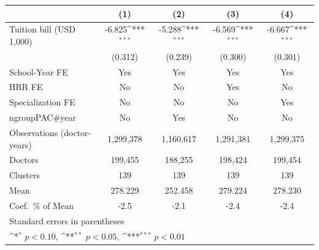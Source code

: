 {
\def\sym#1{\ifmmode^{#1}\else\(^{#1}\)\fi}
\begin{tabular}{l*{4}{c}}
\hline\hline
                    &\multicolumn{1}{c}{(1)}         &\multicolumn{1}{c}{(2)}         &\multicolumn{1}{c}{(3)}         &\multicolumn{1}{c}{(4)}         \\
\hline
Tuition bill (USD 1,000)&      -6.825\sym{***}&      -5.288\sym{***}&      -6.569\sym{***}&      -6.667\sym{***}\\
                    &     (0.312)         &     (0.239)         &     (0.300)         &     (0.301)         \\
[1em]
School-Year FE      &         Yes         &         Yes         &         Yes         &         Yes         \\
[1em]
HRR FE              &          No         &          No         &         Yes         &          No         \\
[1em]
Specialization FE   &          No         &          No         &          No         &         Yes         \\
[1em]
ngroupPAC#year      &          No         &         Yes         &          No         &          No         \\
\hline
Observations (doctor-years)&   1,299,378         &   1,160,617         &   1,291,381         &   1,299,375         \\
Doctors             &     199,455         &     188,255         &     198,424         &     199,454         \\
Clusters            &         139         &         139         &         139         &         139         \\
Mean                &     278.229         &     252.458         &     279.224         &     278.230         \\
Coef.\ \% of Mean   &        -2.5         &        -2.1         &        -2.4         &        -2.4         \\
\hline\hline
\multicolumn{5}{l}{\footnotesize Standard errors in parentheses}\\
\multicolumn{5}{l}{\footnotesize \sym{*} \(p<0.10\), \sym{**} \(p<0.05\), \sym{***} \(p<0.01\)}\\
\end{tabular}
}
